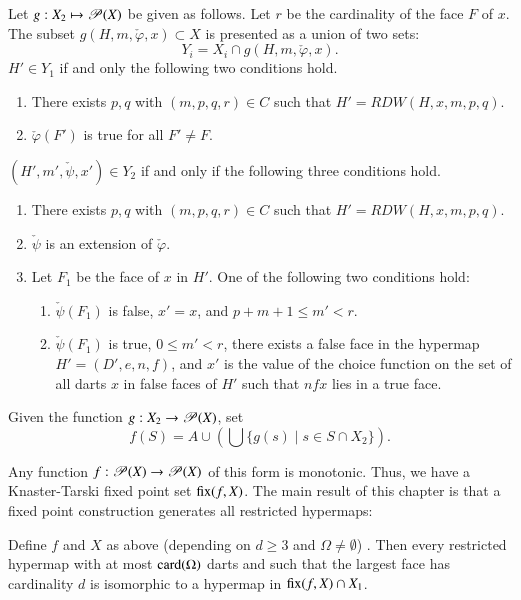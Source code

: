\begin{definition}[g]
 Let $g:X_2 \mapsto {\mathscr P}(X)$ be given as
  follows.  Let $r$ be the cardinality of the face $F$ of $x$.  The
  subset $g(H,m,\check\varphi,x)\subset X$ is presented as a union of two
  sets:
\[ 
   Y_i = X_i \cap g(H,m,\check\varphi,x).
\] 
 $H'\in Y_1$ if and only the following two conditions hold.
\begin{enumerate}
\item There exists
$p,q$ with $(m,p,q,r)\in C$ such that $H'=RDW(H,x,m,p,q)$.
\item $\check\varphi(F')$ is true for all $F'\ne F$.
\end{enumerate}
\smallskip
 $(H',m',\check\psi,x')\in Y_2$ if and only if the following three conditions hold.
\begin{enumerate}
\item There exists $p,q$ with $(m,p,q,r)\in C$ such that $H'=RDW(H,x,m,p,q)$.
\item  $\check\psi$ is an extension of
$\check\varphi$.
\item Let $F_1$ be the face of $x$ in $H'$.  One of the following two
  conditions hold:
\begin{enumerate}\wasitemize 
\item $\check\psi(F_1)$ is false,  $x' = x$, and  $p+m+1 \le m' < r$.
\item $\check\psi(F_1)$ is true, $0 \le m' < r$, 
  there exists a false face in the hypermap $H' = (D',e,n,f)$, and $x'$ is
  the value of the choice function on the set of all darts $x$ in false faces of $H'$
  such that $n f x$ lies in a true face.  
\end{enumerate}\wasitemize 
\end{enumerate}
\end{definition}


\begin{definition}[f]
Given the function 
$g:X_2 \to {\mathscr P}(X)$, set 
\[ f(S) = A \cup (\bigcup \{g(s) \mid s\in S\cap
X_2\}).\] 
%
\end{definition}

Any function $f :{\mathscr P}(X)\to {\mathscr P}(X)$ of this form is
monotonic.  Thus, we have a Knaster-Tarski fixed point set
${\operatorname{fix}}(f,X)$.  The main result of this chapter is that a fixed
point construction generates all restricted hypermaps:

\begin{theorem}  
\label{lemma:algorithm}
Define $f $ and $X$ as above (depending on $d\ge 3$ and $\Omega\ne
\emptyset$) .  Then every restricted hypermap with at most
${\operatorname{card}}(\Omega)$ darts and such that the largest face has cardinality $d$ is
isomorphic to a hypermap in ${\operatorname{fix}}(f,X)\cap X_1$.
\end{theorem}


